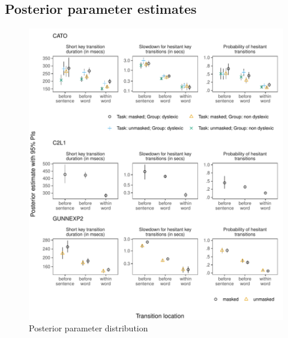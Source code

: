 \documentclass[
  english,
  man,floatsintext]{apa7}
\begin{document}
\clearpage
\makeatletter
\efloat@restorefloats
\makeatother


\begin{appendix}
\section{}
\hypertarget{posterior-parameter-estimates}{%
\subsection{Posterior parameter
estimates}\label{posterior-parameter-estimates}}

\begin{figure}[!htb]
\centering
\includegraphics{figures/psplots1.pdf}
\caption{Posterior parameter distribution}
\end{figure}
\newpage
\begin{figure}[!htb]
\ContinuedFloat
\captionsetup{list=off,format=cont}
\centering

\end{figure}
\end{appendix}
\end{document}
